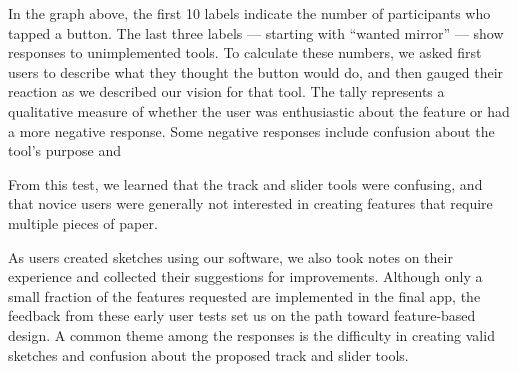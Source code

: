 In the graph above, the first 10 labels indicate the number of
participants who tapped a button. The last three labels --- starting
with ``wanted mirror'' --- show responses to unimplemented tools. To
calculate these numbers, we asked first users to describe what they
thought the button would do, and then gauged their reaction as we
described our vision for that tool. The tally represents a qualitative
measure of whether the user was enthusiastic about the feature or had a
more negative response. Some negative responses include confusion about
the tool's purpose and

From this test, we learned that the track and slider tools were
confusing, and that novice users were generally not interested in
creating features that require multiple pieces of paper.

As users created sketches using our software, we also took notes on
their experience and collected their suggestions for improvements.
Although only a small fraction of the features requested are implemented
in the final app, the feedback from these early user tests set us on the
path toward feature-based design. A common theme among the responses is
the difficulty in creating valid sketches and confusion about the
proposed track and slider tools.

